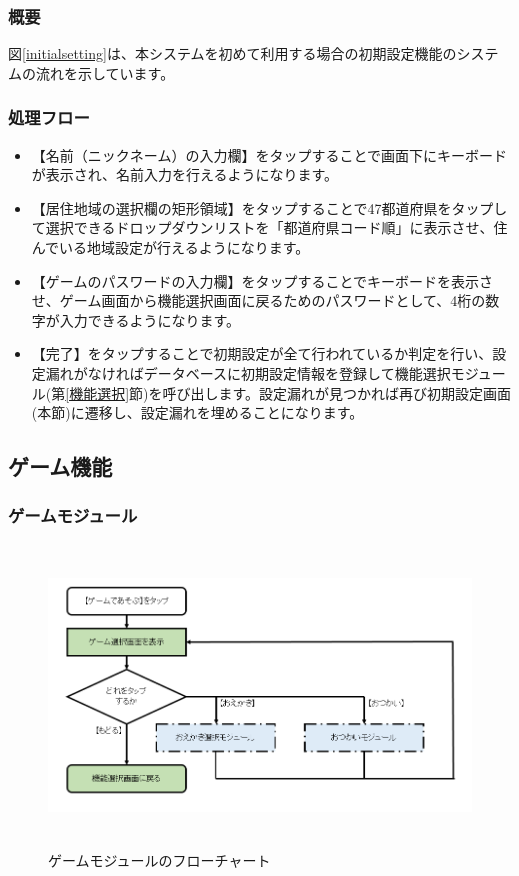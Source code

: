 \documentclass[a4j]{jarticle}
\begin{document}
\subsubsection*{概要}
図\ref{initialsetting}は、本システムを初めて利用する場合の初期設定機能のシステムの流れを示しています。


\subsubsection*{処理フロー}
\begin{itemize}
\item 【名前（ニックネーム）の入力欄】をタップすることで画面下にキーボードが表示され、名前入力を行えるようになります。

\item 【居住地域の選択欄の矩形領域】をタップすることで47都道府県をタップして選択できるドロップダウンリストを「都道府県コード順」に表示させ、住んでいる地域設定が行えるようになります。

\item 【ゲームのパスワードの入力欄】をタップすることでキーボードを表示させ、ゲーム画面から機能選択画面に戻るためのパスワードとして、4桁の数字が入力できるようになります。

\item 【完了】をタップすることで初期設定が全て行われているか判定を行い、設定漏れがなければデータベースに初期設定情報を登録して機能選択モジュール(第\ref{機能選択}節)を呼び出します。設定漏れが見つかれば再び初期設定画面(本節)に遷移し、設定漏れを埋めることになります。
\end{itemize}

\newpage
\subsection{ゲーム機能}
\subsubsection{ゲームモジュール\label{ゲーム}}
\begin{figure}[h]
    \begin{flushleft}
    \includegraphics[height=8.0cm] {game.png}
    \caption {ゲームモジュールのフローチャート}
    \label{game}
    \end{flushleft}
\end{figure}
\end{document}
